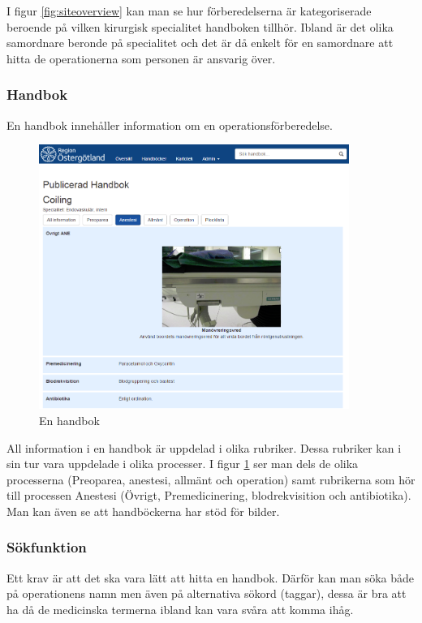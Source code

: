 I figur \ref{fig:siteoverview} kan man se hur förberedelserna är kategoriserade beroende på vilken kirurgisk specialitet handboken tillhör.
Ibland är det olika samordnare beronde på specialitet och det är då enkelt för en samordnare att hitta de operationerna som personen är ansvarig över.

\subsubsection{Handbok}
En handbok innehåller information om en operationsförberedelse.

\begin{figure}
  \centering
  \includegraphics[width=0.9\textwidth]{images/site/handbok.png}
  \caption{En handbok}
  \label{fig:handbok}
\end{figure}

All information i en handbok är uppdelad i olika rubriker. Dessa rubriker kan i sin tur vara uppdelade i olika processer.
I figur \ref{fig:handbok} ser man dels de olika processerna (Preoparea, anestesi, allmänt och operation) samt rubrikerna som hör till processen Anestesi (Övrigt, Premedicinering, blodrekvisition och  antibiotika).
Man kan även se att handböckerna har stöd för bilder.

\subsubsection{Sökfunktion}
Ett krav är att det ska vara lätt att hitta en handbok.
Därför kan man söka både på operationens namn men även på alternativa sökord (taggar), dessa är bra att ha då de medicinska termerna ibland kan vara svåra att komma ihåg.


